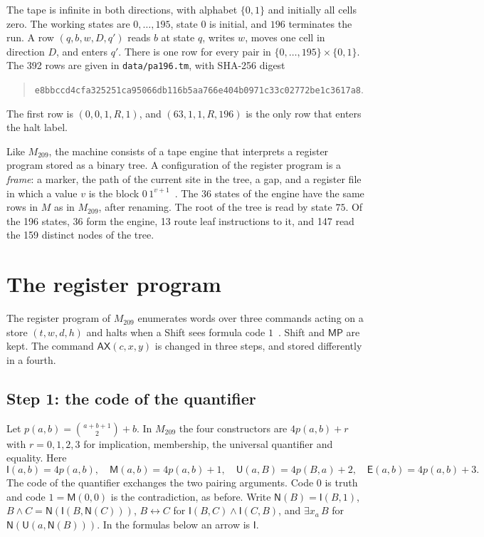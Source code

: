 \documentclass[11pt,letterpaper]{article}
\newcommand{\ax}{\mathsf{AX}}
\newcommand{\mpc}{\mathsf{MP}}
\newcommand{\Ic}{\mathsf{I}}
\newcommand{\Mc}{\mathsf{M}}
\newcommand{\Uc}{\mathsf{U}}
\newcommand{\Ec}{\mathsf{E}}
\newcommand{\Nc}{\mathsf{N}}
\newcommand{\file}[1]{\texttt{\nolinkurl{#1}}}
\begin{document}
The tape is infinite in both directions, with alphabet $\{0,1\}$ and
initially all cells zero. The working states are $0,\ldots,195$, state
$0$ is initial, and $196$ terminates the run. A row $(q,b,w,D,q')$
reads $b$ at state $q$, writes $w$, moves one cell in direction $D$,
and enters $q'$. There is one row for every pair in
$\{0,\ldots,195\}\times\{0,1\}$. The 392 rows are given in
\file{data/pa196.tm}, with SHA-256 digest
\begin{quote}\small
\nolinkurl{e8bbccd4cfa325251ca95066db116b5aa766e404b0971c33c02772be1c3617a8}.
\end{quote}
The first row is $(0,0,1,R,1)$, and $(63,1,1,R,196)$ is the only row
that enters the halt label.

Like $M_{209}$, the machine consists of a tape engine that interprets
a register program stored as a binary tree. A configuration of the
register program is a \emph{frame}: a marker, the path of the current
site in the tree, a gap, and a register file in which a value $v$ is
the block $0\,1^{v+1}$~\cite[\S3]{pa209}. The 36 states of the engine
have the same rows in $M$ as in $M_{209}$, after renaming. The root of
the tree is read by state $75$. Of the 196 states, 36 form the engine,
13 route leaf instructions to it, and 147 read the 159 distinct nodes
of the tree.

\section{The register program}\label{sec:steps}

The register program of $M_{209}$ enumerates words over three commands
acting on a store $(t,w,d,h)$ and halts when a Shift sees formula code
$1$~\cite[\S4]{pa209}. Shift and $\mpc$ are kept. The command
$\ax(c,x,y)$ is changed in three steps, and stored differently in a
fourth.

\subsection{Step 1: the code of the quantifier}

Let $p(a,b)=\binom{a+b+1}{2}+b$. In $M_{209}$ the four constructors
are $4p(a,b)+r$ with $r=0,1,2,3$ for implication, membership, the
universal quantifier and equality. Here
\[
 \Ic(a,b)=4p(a,b),\quad \Mc(a,b)=4p(a,b)+1,\quad
 \Uc(a,B)=4p(B,a)+2,\quad \Ec(a,b)=4p(a,b)+3 .
\]
The code of the quantifier exchanges the two pairing arguments. Code $0$ is truth and code
$1=\Mc(0,0)$ is the contradiction, as before. Write
$\Nc(B)=\Ic(B,1)$, $B\wedge C=\Nc(\Ic(B,\Nc(C)))$,
$B\leftrightarrow C$ for $\Ic(B,C)\wedge\Ic(C,B)$, and
$\exists x_a\,B$ for $\Nc(\Uc(a,\Nc(B)))$. In the formulas below an
arrow is $\Ic$.
\end{document}
